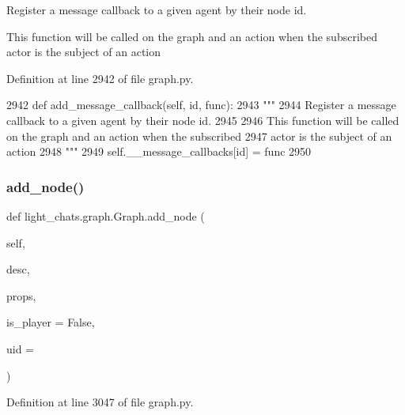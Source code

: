 \begin{DoxyVerb}Register a message callback to a given agent by their node id.

This function will be called on the graph and an action when the subscribed
actor is the subject of an action
\end{DoxyVerb}
 

Definition at line 2942 of file graph.\+py.


\begin{DoxyCode}
2942     \textcolor{keyword}{def }add\_message\_callback(self, id, func):
2943         \textcolor{stringliteral}{"""}
2944 \textcolor{stringliteral}{        Register a message callback to a given agent by their node id.}
2945 \textcolor{stringliteral}{}
2946 \textcolor{stringliteral}{        This function will be called on the graph and an action when the subscribed}
2947 \textcolor{stringliteral}{        actor is the subject of an action}
2948 \textcolor{stringliteral}{        """}
2949         self.\_\_message\_callbacks[id] = func
2950 
\end{DoxyCode}
\mbox{\label{classlight__chats_1_1graph_1_1Graph_a5356cdaf2e48b3a128773c70957cb38a}} 
\subsubsection{\texorpdfstring{add\+\_\+node()}{add\_node()}}
{\footnotesize\ttfamily def light\+\_\+chats.\+graph.\+Graph.\+add\+\_\+node (\begin{DoxyParamCaption}\item[{}]{self,  }\item[{}]{desc,  }\item[{}]{props,  }\item[{}]{is\+\_\+player = {\ttfamily False},  }\item[{}]{uid = {\ttfamily \textquotesingle{}\textquotesingle{}} }\end{DoxyParamCaption})}



Definition at line 3047 of file graph.\+py.


